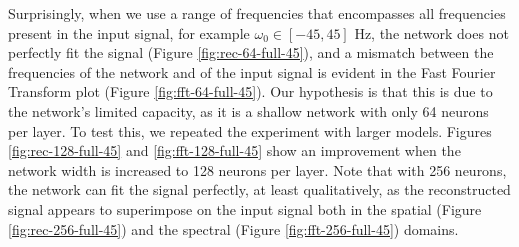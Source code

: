 Surprisingly, when we use a range of frequencies that encompasses all frequencies present in the input signal, for example $\omega_0 \in [-45, 45]$ Hz, the network does not perfectly fit the signal (Figure \ref{fig:rec-64-full-45}), and a mismatch between the frequencies of the network and of the input signal is evident in the Fast Fourier Transform plot (Figure \ref{fig:fft-64-full-45}). Our hypothesis is that this is due to the network's limited capacity, as it is a shallow network with only 64 neurons per layer. To test this, we repeated the experiment with larger models. Figures \ref{fig:rec-128-full-45} and \ref{fig:fft-128-full-45} show an improvement when the network width is increased to 128 neurons per layer. Note that with 256 neurons, the network can fit the signal perfectly, at least qualitatively, as the reconstructed signal appears to superimpose on the input signal both in the spatial (Figure \ref{fig:rec-256-full-45}) and the spectral (Figure \ref{fig:fft-256-full-45}) domains.

